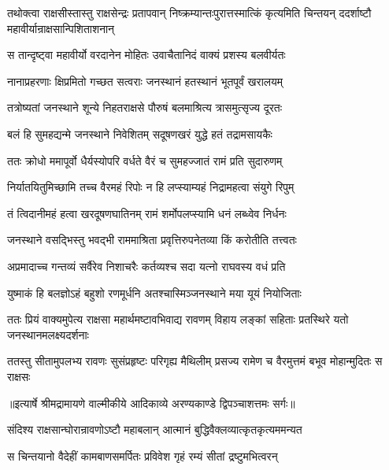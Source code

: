 \threelineshloka
{तथोक्त्वा राक्षसीस्तास्तु राक्षसेन्द्रः प्रतापवान्}
{निष्क्रम्यान्तःपुरात्तस्मात्किं कृत्यमिति चिन्तयन्}
{ददर्शाष्टौ महावीर्यान्राक्षसान्पिशिताशनान्} %

\twolineshloka
{स तान्दृष्ट्वा महावीर्यो वरदानेन मोहितः}
{उवाचैतानिदं वाक्यं प्रशस्य बलवीर्यतः} %

\twolineshloka
{नानाप्रहरणाः क्षिप्रमितो गच्छत सत्वराः}
{जनस्थानं हतस्थानं भूतपूर्वं खरालयम्} %

\twolineshloka
{तत्रोष्यतां जनस्थाने शून्ये निहतराक्षसे}
{पौरुषं बलमाश्रित्य त्रासमुत्सृज्य दूरतः} %

\twolineshloka
{बलं हि सुमहद्यन्मे जनस्थाने निवेशितम्}
{सदूषणखरं युद्धे हतं तद्रामसायकैः} %

\twolineshloka
{ततः क्रोधो ममापूर्वो धैर्यस्योपरि वर्धते}
{वैरं च सुमहज्जातं रामं प्रति सुदारुणम्} %

\twolineshloka
{निर्यातयितुमिच्छामि तच्च वैरमहं रिपोः}
{न हि लप्स्याम्यहं निद्रामहत्वा संयुगे रिपुम्} %

\twolineshloka
{तं त्विदानीमहं हत्वा खरदूषणघातिनम्}
{रामं शर्मोपलप्स्यामि धनं लब्ध्वेव निर्धनः} %

\twolineshloka
{जनस्थाने वसद्भिस्तु भवद्भी राममाश्रिता}
{प्रवृत्तिरुपनेतव्या किं करोतीति तत्त्वतः} %

\twolineshloka
{अप्रमादाच्च गन्तव्यं सर्वैरेव निशाचरैः}
{कर्तव्यश्च सदा यत्नो राघवस्य वधं प्रति} %

\twolineshloka
{युष्माकं हि बलज्ञोऽहं बहुशो रणमूर्धनि}
{अतश्चास्मिञ्जनस्थाने मया यूयं नियोजिताः} %

\fourlineindentedshloka
{ततः प्रियं वाक्यमुपेत्य राक्षसा}
{ महार्थमष्टावभिवाद्य रावणम्}
{विहाय लङ्कां सहिताः प्रतस्थिरे}
{ यतो जनस्थानमलक्ष्यदर्शनाः} %

\fourlineindentedshloka
{ततस्तु सीतामुपलभ्य रावणः}
{ सुसंप्रहृष्टः परिगृह्य मैथिलीम्}
{प्रसज्य रामेण च वैरमुत्तमं}
{ बभूव मोहान्मुदितः स राक्षसः} %


{॥इत्यार्षे श्रीमद्रामायणे वाल्मीकीये आदिकाव्ये अरण्यकाण्डे द्विपञ्चाशत्तमः सर्गः॥}


\twolineshloka
{संदिश्य राक्षसान्घोरान्रावणोऽष्टौ महाबलान्}
{आत्मानं बुद्धिवैक्लव्यात्कृतकृत्यममन्यत} %

\twolineshloka
{स चिन्तयानो वैदेहीं कामबाणसमर्पितः}
{प्रविवेश गृहं रम्यं सीतां द्रष्टुमभित्वरन्} %

